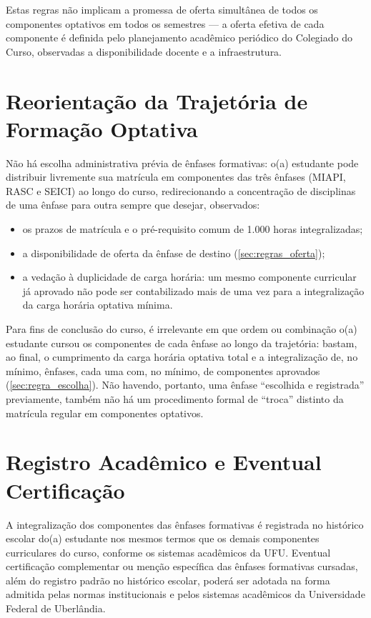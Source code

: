 Estas regras não implicam a promessa de oferta simultânea de todos os componentes optativos em todos os semestres — a oferta efetiva de cada componente é definida pelo planejamento acadêmico periódico do Colegiado do Curso, observadas a disponibilidade docente e a infraestrutura.

\section{Reorientação da Trajetória de Formação Optativa}
\label{sec:mudanca_area}

Não há escolha administrativa prévia de ênfases formativas: o(a) estudante pode distribuir livremente sua matrícula em componentes das três ênfases (MIAPI, RASC e SEICI) ao longo do curso, redirecionando a concentração de disciplinas de uma ênfase para outra sempre que desejar, observados:

\begin{itemize}
    \item os prazos de matrícula e o pré-requisito comum de 1.000 horas integralizadas;
    \item a disponibilidade de oferta da ênfase de destino (\autoref{sec:regras_oferta});
    \item a vedação à duplicidade de carga horária: um mesmo componente curricular já aprovado não pode ser contabilizado mais de uma vez para a integralização da carga horária optativa mínima.
\end{itemize}

Para fins de conclusão do curso, é irrelevante em que ordem ou combinação o(a) estudante cursou os componentes de cada ênfase ao longo da trajetória: bastam, ao final, o cumprimento da carga horária optativa total e a integralização de, no mínimo, \textbf{} ênfases, cada uma com, no mínimo, \textbf{} de componentes aprovados (\autoref{sec:regra_escolha}). Não havendo, portanto, uma ênfase ``escolhida e registrada'' previamente, também não há um procedimento formal de ``troca'' distinto da matrícula regular em componentes optativos.

\section{Registro Acadêmico e Eventual Certificação}
\label{sec:registro_certificacao}

A integralização dos componentes das ênfases formativas é registrada no histórico escolar do(a) estudante nos mesmos termos que os demais componentes curriculares do curso, conforme os sistemas acadêmicos da UFU. Eventual certificação complementar ou menção específica das ênfases formativas cursadas, além do registro padrão no histórico escolar, poderá ser adotada na forma admitida pelas normas institucionais e pelos sistemas acadêmicos da Universidade Federal de Uberlândia.


